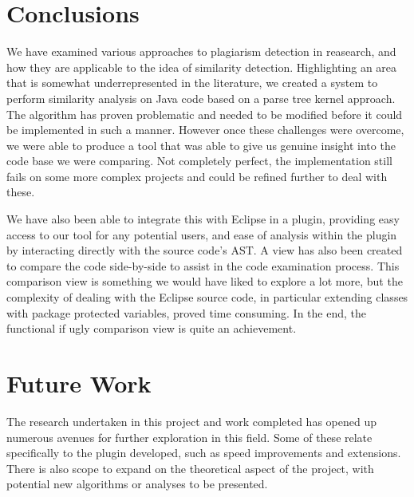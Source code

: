 \chapter{Conclusions}

We have examined various approaches to plagiarism detection in reasearch,
and how they are applicable to the idea of similarity detection.
Highlighting an area that is somewhat underrepresented in the literature,
we created a system to perform similarity analysis on Java code based on a 
parse tree kernel approach. The algorithm has proven problematic and needed
to be modified before it could be implemented in such a manner.
However once these challenges were overcome, we were able to produce a tool
that was able to give us genuine insight into the code base we were comparing.
Not completely perfect, the implementation still fails on some more complex
projects and could be refined further to deal with these.

We have also been able to integrate this with Eclipse in a plugin, providing
easy access to our tool for any potential users, and ease of analysis within
the plugin by interacting directly with the source code's AST. A view has
also been created to compare the code side-by-side to assist in the code
examination process. This comparison view is something we would have liked
to explore a lot more, but the complexity of dealing with the Eclipse 
source code, in particular extending classes with package protected variables,
proved time consuming. In the end, the functional if ugly comparison view
is quite an achievement.

\chapter{Future Work}
\label{Future Work}

The research undertaken in this project and work completed has opened up
numerous avenues for further exploration in this field. Some of these
relate specifically to the plugin developed, such as speed improvements and extensions.
There is also scope to expand on the theoretical aspect of the project, with potential
new algorithms or analyses to be presented.

